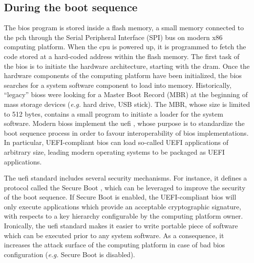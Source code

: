 \subsection{During the boot sequence}
\label{subsec:usecase:firm:boot}

The \ac{bios} program is stored inside a flash memory, a small memory connected
to the \ac{pch} through the Serial Peripheral Interface (SPI) bus on modern x86
computing platform.
%
When the \ac{cpu} is powered up, it is programmed to fetch the code stored at a
hard-coded address within the flash memory.
%
The first task of the \ac{bios} is to initiate the hardware architecture,
starting with the \ac{dram}. 
%
Once the hardware components of the computing platform have been initialized,
the \ac{bios} searches for a system software component to load into memory.
%
Historically, ``legacy'' \acp{bios} were looking for a Master Boot Record (MBR)
at the beginning of mass storage devices (\emph{e.g.} hard drive, USB stick).
%
The MBR, whose size is limited to 512 bytes, contains a small program to
initiate a loader for the system software.
%
Modern \acp{bios} implement the \ac{uefi} , whose purpose is to
standardize the boot sequence process in order to favour interoperability of
\ac{bios} implementations.
%
In particular, UEFI-compliant \ac{bios} can load so-called UEFI applications of
arbitrary size, leading modern operating systems  to be packaged as UEFI applications.

The \ac{uefi} standard includes several security mechanisms.
%
For instance, it defines a protocol called the Secure Boot , which
can be leveraged to improve the security of the boot sequence.
%
If Secure Boot is enabled, the UEFI-compliant \ac{bios} will only execute
applications which provide an acceptable cryptographic signature, with respects
to a key hierarchy configurable by the computing platform owner.
%
Ironically, the \ac{uefi} standard makes it easier to write portable piece of
software which can be executed prior to any system software.
%
As a consequence, it increases the attack surface of the computing platform in
case of bad \ac{bios} configuration (\emph{e.g.} Secure Boot is disabled).
%


